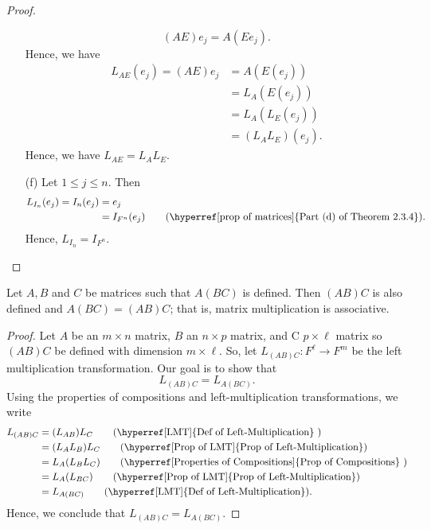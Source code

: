 \begin{proof}
\begin{enumerate}
            \[  (AE){e}_{j} = A(E {e}_{j}). \]
            Hence, we have
            \begin{align*}  {L}_{AE}({e}_{j}) = (AE) {e}_{j} &= A(E({e}_{j})) \\ 
            &= {L}_{A}(E({e}_{j})) \\ 
            &= {L}_{A} ({L}_{E}({e}_{j})) \\ 
            &= ({L}_{A}{L}_{E})({e}_{j}).
            \end{align*}
            Hence, we have \( {L}_{AE} = {L}_{A} {L}_{E} \).
        \item[(f)] Let \( 1 \leq j \leq n  \). Then
                \begin{align*}  {L}_{{I}_{n}}({e}_{j}) = {I}_{n}({e}_{j}) 
                &= {e}_{j} \\ 
                &= {I}_{F^{n}}({e}_{j}) \tag{{\hyperref[prop of matrices]{Part (d) of Theorem 2.3.4}}}. 
                \end{align*}
            Hence, \( {L}_{{I}_{n}} = {I}_{F^{n}} \).
   \end{enumerate}
\end{proof}

\begin{theorem}
Let \( A, B  \) and \( C  \) be matrices such that \( A(BC) \) is defined. Then \( (AB)C  \) is also defined and \( A(BC) = (AB)C  \); that is, matrix multiplication is associative.    
\end{theorem}
\begin{proof}
Let \( A  \) be an \( m \times n  \) matrix, \( B  \) an \(  n \times p  \) matrix, and C \( p \times \ell  \) matrix so \( (AB)C \) be defined with dimension \( m \times \ell  \). So, let \( {L}_{(AB)C}: F^{\ell} \to F^{m}   \) be the left multiplication transformation. Our goal is to show that
\[ {L}_{(AB)C} = {L}_{A(BC)}. \]
Using the properties of compositions and left-multiplication transformations, we write 
\begin{align*} 
    {L}_{(AB)C}                  &= ({L}_{AB}) {L}_{C} \tag{{\hyperref[LMT]{Def of Left-Multiplication}} }   \\
                                 &= ( {L}_{A} {L}_{B} )  {L}_{C} \tag{{\hyperref[Prop of LMT]{Prop of Left-Multiplication}}} \\ 
                                 &= {L}_{A} ({L}_{B} {L}_{C}) \tag{{\hyperref[Properties of Compositions]{Prop of Compositions}} } \\ 
                                 &= {L}_{A} ({L}_{BC}) \tag{{\hyperref[Prop of LMT]{Prop of Left-Multiplication}}} \\ 
                                 &=  {L}_{A(BC)} \tag{{\hyperref[LMT]{Def of Left-Multiplication}}}.       
\end{align*}
Hence, we conclude that \( {L}_{(AB)C} = {L}_{A(BC)} \).
\end{proof}

